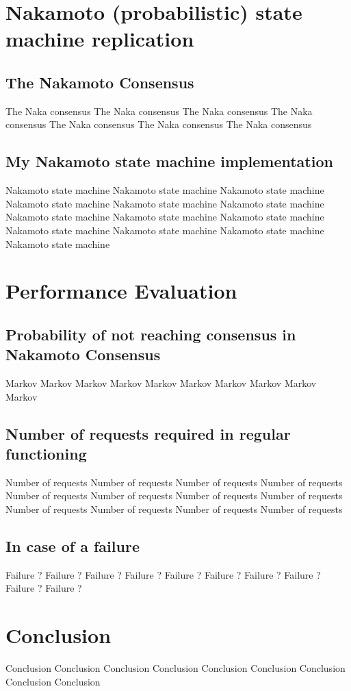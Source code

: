 \documentclass[11pt, twocolumn]{article}
\begin{document}
\section{Nakamoto (probabilistic) state machine replication}
\subsection{The Nakamoto Consensus}

The Naka consensus
The Naka consensus
The Naka consensus
The Naka consensus
The Naka consensus
The Naka consensus
The Naka consensus

\subsection{My Nakamoto state machine implementation}

Nakamoto state machine
Nakamoto state machine
Nakamoto state machine
Nakamoto state machine
Nakamoto state machine
Nakamoto state machine
Nakamoto state machine
Nakamoto state machine
Nakamoto state machine
Nakamoto state machine
Nakamoto state machine
Nakamoto state machine
Nakamoto state machine

\section{Performance Evaluation}
\subsection{Probability of not reaching consensus in Nakamoto Consensus}

Markov
Markov
Markov
Markov
Markov
Markov
Markov
Markov
Markov
Markov

\subsection{Number of requests required in regular functioning}

Number of requests
Number of requests
Number of requests
Number of requests
Number of requests
Number of requests
Number of requests
Number of requests
Number of requests
Number of requests
Number of requests
Number of requests

\subsection{In case of a failure}

Failure ?
Failure ?
Failure ?
Failure ?
Failure ?
Failure ?
Failure ?
Failure ?
Failure ?
Failure ?

\section{Conclusion}

Conclusion
Conclusion
Conclusion
Conclusion
Conclusion
Conclusion
Conclusion
Conclusion
Conclusion



\end{document}

